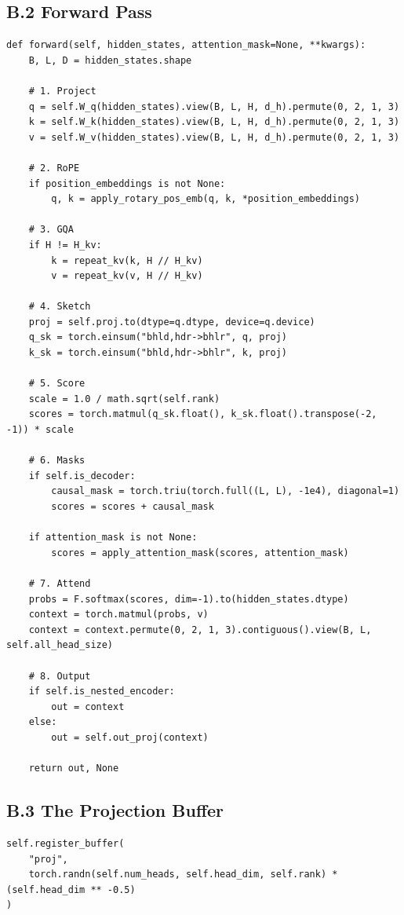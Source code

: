 \subsection{B.2 Forward Pass}

\begin{lstlisting}
def forward(self, hidden_states, attention_mask=None, **kwargs):
    B, L, D = hidden_states.shape
    
    # 1. Project
    q = self.W_q(hidden_states).view(B, L, H, d_h).permute(0, 2, 1, 3)
    k = self.W_k(hidden_states).view(B, L, H, d_h).permute(0, 2, 1, 3)
    v = self.W_v(hidden_states).view(B, L, H, d_h).permute(0, 2, 1, 3)
    
    # 2. RoPE
    if position_embeddings is not None:
        q, k = apply_rotary_pos_emb(q, k, *position_embeddings)
    
    # 3. GQA
    if H != H_kv:
        k = repeat_kv(k, H // H_kv)
        v = repeat_kv(v, H // H_kv)
    
    # 4. Sketch
    proj = self.proj.to(dtype=q.dtype, device=q.device)
    q_sk = torch.einsum("bhld,hdr->bhlr", q, proj)
    k_sk = torch.einsum("bhld,hdr->bhlr", k, proj)
    
    # 5. Score
    scale = 1.0 / math.sqrt(self.rank)
    scores = torch.matmul(q_sk.float(), k_sk.float().transpose(-2, -1)) * scale
    
    # 6. Masks
    if self.is_decoder:
        causal_mask = torch.triu(torch.full((L, L), -1e4), diagonal=1)
        scores = scores + causal_mask
    
    if attention_mask is not None:
        scores = apply_attention_mask(scores, attention_mask)
    
    # 7. Attend
    probs = F.softmax(scores, dim=-1).to(hidden_states.dtype)
    context = torch.matmul(probs, v)
    context = context.permute(0, 2, 1, 3).contiguous().view(B, L, self.all_head_size)
    
    # 8. Output
    if self.is_nested_encoder:
        out = context
    else:
        out = self.out_proj(context)
    
    return out, None
\end{lstlisting}

\subsection{B.3 The Projection Buffer}

\begin{lstlisting}
self.register_buffer(
    "proj",
    torch.randn(self.num_heads, self.head_dim, self.rank) * (self.head_dim ** -0.5)
)
\end{lstlisting}

